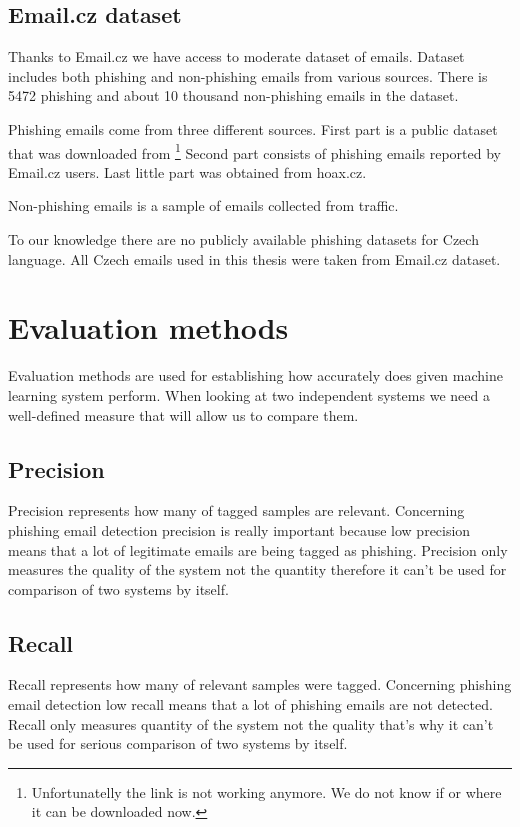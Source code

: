 \documentclass[thesis=B,english]{FITthesis}[2012/10/20]
\begin{document}
\subsection{Email.cz dataset} \label{emailczdata}
\par Thanks to Email.cz we have access to moderate dataset of emails. Dataset includes both phishing and non-phishing emails from various sources. There is 5472 phishing and about 10 thousand non-phishing emails in the dataset.
\par Phishing emails come from three different sources.
First part is a public dataset that was downloaded from \cite{monkeyDataset} \footnote{Unfortunatelly the link is not working anymore. We do not know if or where it can be downloaded now.} Second part consists of phishing emails reported by Email.cz users. Last little part was obtained from hoax.cz. 
\par Non-phishing emails is a sample of emails collected from traffic.

\par To our knowledge there are no publicly available phishing datasets for Czech language. All Czech emails used in this thesis were taken from Email.cz dataset. 


\section{Evaluation methods}
Evaluation methods are used for establishing how accurately does given machine learning system perform. When looking at two independent systems we need a well-defined measure that will allow us to compare them.  

\subsection{Precision} \label{precision}
Precision represents how many of tagged samples are relevant. Concerning phishing email detection precision is really important because low precision means that a lot of legitimate emails are being tagged as phishing. Precision only measures the quality of the system not the quantity therefore it can't be used for comparison of two systems by itself.

\subsection{Recall} \label{recall}
Recall represents how many of relevant samples were tagged. Concerning phishing email detection low recall means that a lot of phishing emails are not detected. Recall only measures quantity of the system not the quality that's why it can't be used for serious comparison of two systems by itself.
\end{document}
